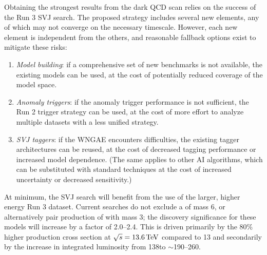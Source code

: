 Obtaining the strongest results from the dark QCD scan relies on the success of the Run 3 SVJ search.
The proposed strategy includes several new elements, any of which may not converge on the necessary timescale.
However, each new element is independent from the others, and reasonable fallback options exist to mitigate these risks:
\begin{enumerate}
\item \textit{Model building}: if a comprehensive set of new benchmarks is not available, the existing models can be used, at the cost of potentially reduced coverage of the model space.
\item \textit{Anomaly triggers}: if the anomaly trigger performance is not sufficient, the Run 2 trigger strategy can be used, at the cost of more effort to analyze multiple datasets with a less unified strategy.
\item \textit{SVJ taggers}: if the WNGAE encounters difficulties, the existing tagger architectures can be reused, at the cost of decreased tagging performance or increased model dependence. (The same applies to other AI algorithms, which can be substituted with standard techniques at the cost of increased uncertainty or decreased sensitivity.)
\end{enumerate}
At minimum, the SVJ search will benefit from the use of the larger, higher energy Run 3 dataset.
Current searches do not exclude a \PZprime of mass 6\TeV, or alternatively pair production of \Pbifun with mass 3\TeV;
the discovery significance for these models will increase by a factor of 2.0--2.4.
This is driven primarily by the 80\% higher production cross section at $\sqrt{s}=13.6\,\text{Te\hspace{-.08em}V}$ compared to 13\TeV
and secondarily by the increase in integrated luminosity from 138\fbinv to ${\sim}$190--260\fbinv.
